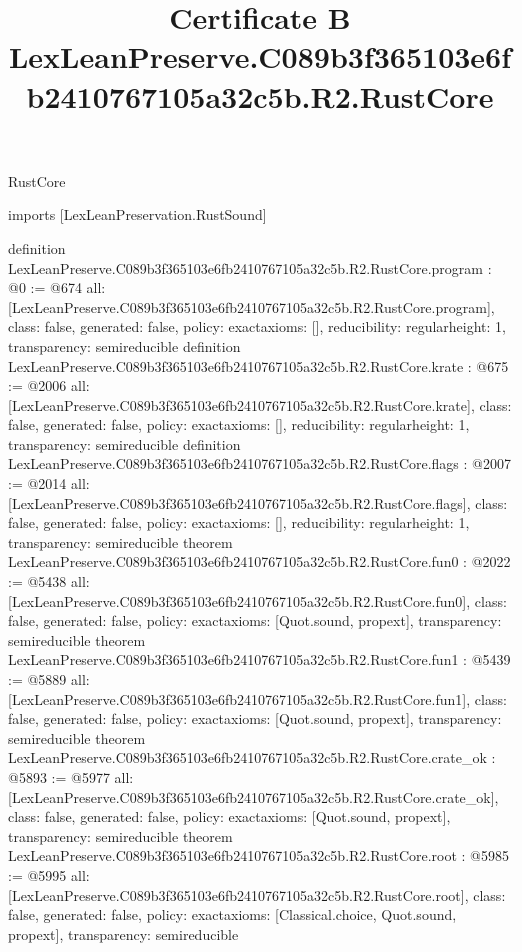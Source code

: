 \begin{lexlean}{RustCore}
\title{Certificate B LexLeanPreserve.C089b3f365103e6fb2410767105a32c5b.R2.RustCore}
\begin{coremodule}
imports [LexLeanPreservation.RustSound]

definition LexLeanPreserve.C089b3f365103e6fb2410767105a32c5b.R2.RustCore.program : @0 := @674 {
  all: [LexLeanPreserve.C089b3f365103e6fb2410767105a32c5b.R2.RustCore.program],
  class: false,
  generated: false,
  policy: exact{axioms: []},
  reducibility: regular{height: 1},
  transparency: semireducible
}
definition LexLeanPreserve.C089b3f365103e6fb2410767105a32c5b.R2.RustCore.krate : @675 := @2006 {
  all: [LexLeanPreserve.C089b3f365103e6fb2410767105a32c5b.R2.RustCore.krate],
  class: false,
  generated: false,
  policy: exact{axioms: []},
  reducibility: regular{height: 1},
  transparency: semireducible
}
definition LexLeanPreserve.C089b3f365103e6fb2410767105a32c5b.R2.RustCore.flags : @2007 := @2014 {
  all: [LexLeanPreserve.C089b3f365103e6fb2410767105a32c5b.R2.RustCore.flags],
  class: false,
  generated: false,
  policy: exact{axioms: []},
  reducibility: regular{height: 1},
  transparency: semireducible
}
theorem LexLeanPreserve.C089b3f365103e6fb2410767105a32c5b.R2.RustCore.fun0 : @2022 := @5438 {
  all: [LexLeanPreserve.C089b3f365103e6fb2410767105a32c5b.R2.RustCore.fun0],
  class: false,
  generated: false,
  policy: exact{axioms: [Quot.sound, propext]},
  transparency: semireducible
}
theorem LexLeanPreserve.C089b3f365103e6fb2410767105a32c5b.R2.RustCore.fun1 : @5439 := @5889 {
  all: [LexLeanPreserve.C089b3f365103e6fb2410767105a32c5b.R2.RustCore.fun1],
  class: false,
  generated: false,
  policy: exact{axioms: [Quot.sound, propext]},
  transparency: semireducible
}
theorem LexLeanPreserve.C089b3f365103e6fb2410767105a32c5b.R2.RustCore.crate_ok : @5893 := @5977 {
  all: [LexLeanPreserve.C089b3f365103e6fb2410767105a32c5b.R2.RustCore.crate_ok],
  class: false,
  generated: false,
  policy: exact{axioms: [Quot.sound, propext]},
  transparency: semireducible
}
theorem LexLeanPreserve.C089b3f365103e6fb2410767105a32c5b.R2.RustCore.root : @5985 := @5995 {
  all: [LexLeanPreserve.C089b3f365103e6fb2410767105a32c5b.R2.RustCore.root],
  class: false,
  generated: false,
  policy: exact{axioms: [Classical.choice, Quot.sound, propext]},
  transparency: semireducible
}


\end{coremodule}
\end{lexlean}

